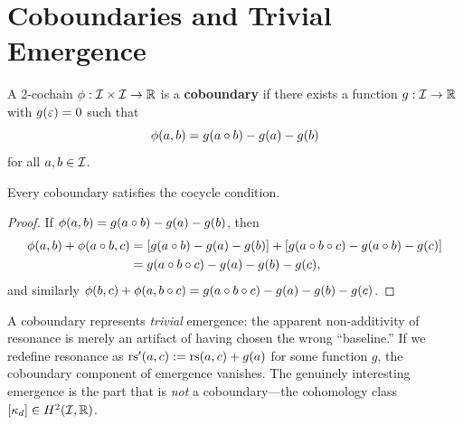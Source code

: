 \section{Coboundaries and Trivial Emergence}

\begin{definition}[Coboundary]\label{def:coboundary}
A 2-cochain $\phi : \mathcal{I} \times \mathcal{I} \to \mathbb{R}$ is a \textbf{coboundary} if
there exists a function $g : \mathcal{I} \to \mathbb{R}$ with $g(\varepsilon) = 0$ such that
\[
    \phi(a, b) = g(a \circ b) - g(a) - g(b)
\]
for all $a, b \in \mathcal{I}$.
\end{definition}

\begin{proposition}
Every coboundary satisfies the cocycle condition.
\end{proposition}
\begin{proof}
If $\phi(a,b) = g(a \circ b) - g(a) - g(b)$, then
\begin{align*}
    \phi(a,b) + \phi(a \circ b, c)
    &= [g(a \circ b) - g(a) - g(b)]
     + [g(a \circ b \circ c) - g(a \circ b) - g(c)] \\
    &= g(a \circ b \circ c) - g(a) - g(b) - g(c),
\end{align*}
and similarly $\phi(b,c) + \phi(a, b \circ c) = g(a \circ b \circ
c) - g(a) - g(b) - g(c)$.
\end{proof}

\begin{interpretation}
A coboundary represents \emph{trivial} emergence: the apparent
non-additivity of resonance is merely an artifact of having chosen the
wrong ``baseline.'' If we redefine resonance as $\mathrm{rs}'(a,c) :=
\mathrm{rs}(a,c) + g(a)$ for some function $g$, the coboundary component of
emergence vanishes. The genuinely interesting emergence is the part that
is \emph{not} a coboundary---the cohomology class $[\kappa_d] \in
H^2(\mathcal{I}, \mathbb{R})$.
\end{interpretation}

